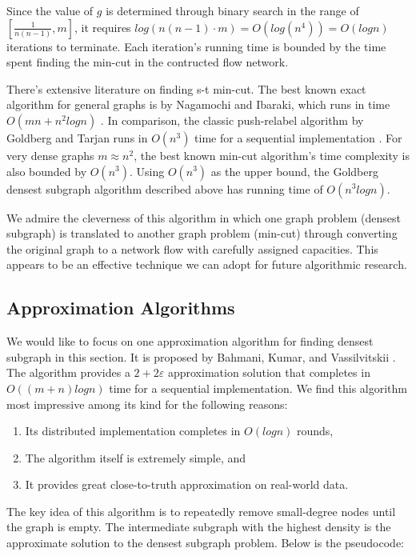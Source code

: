 \documentclass{article}
\begin{document}
Since the value of $g$ is determined through binary search in the range of $[\frac{1}{n(n-1)}, m]$, it requires $log(n(n-1) \cdot m) = O(log(n^4)) = O(logn)$ iterations to terminate. Each iteration's running time is bounded by the time spent finding the min-cut in the contructed flow network.

There's extensive literature on finding s-t min-cut. The best known exact algorithm for general graphs is by Nagamochi and Ibaraki, which runs in time $O(mn + n^2logn)$ \cite{Nagamochi:1992:CEM:131829.131833}. In comparison, the classic push-relabel algorithm by Goldberg and Tarjan runs in $O(n^3)$ time for a sequential implementation \cite{Goldberg:1988:NAM:48014.61051}. For very dense graphs $m \approx n^2$, the best known min-cut algorithm's time complexity is also bounded by $O(n^3)$. Using $O(n^3)$ as the upper bound, the Goldberg densest subgraph algorithm described above has running time of $O(n^3logn)$.

We admire the cleverness of this algorithm in which one graph problem (densest subgraph) is translated to another graph problem (min-cut) through converting the original graph to a network flow with carefully assigned capacities. This appears to be an effective technique we can adopt for future algorithmic research.

\subsection{Approximation Algorithms}
We would like to focus on one approximation algorithm for finding densest subgraph in this section. It is proposed by Bahmani, Kumar, and Vassilvitskii \cite{Bahmani:2012:DSS:2140436.2140442}. The algorithm provides a $2 + 2\varepsilon$ approximation solution that completes in $O((m+n)logn)$ time for a sequential implementation. We find this algorithm most impressive among its kind for the following reasons:

\begin{enumerate}
  \item Its distributed implementation completes in $O(logn)$ rounds,
  \item The algorithm itself is extremely simple, and
  \item It provides great close-to-truth approximation on real-world data.
\end{enumerate}

The key idea of this algorithm is to repeatedly remove small-degree nodes until the graph is empty. The intermediate subgraph with the highest density is the approximate solution to the densest subgraph problem. Below is the pseudocode:
\end{document}
